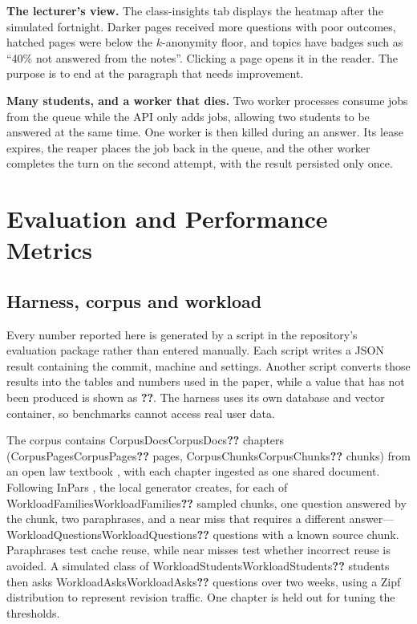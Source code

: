 \documentclass[conference]{IEEEtran}
\newcommand{\val}[1]{\ifcsname #1\endcsname\csname #1\endcsname\else\textbf{??}\fi}
\begin{document}
\textbf{The lecturer's view.} The class-insights tab displays the heatmap after the simulated fortnight. Darker pages received
more questions with poor outcomes, hatched pages were below the $k$-anonymity floor, and topics have
badges such as ``40\% not answered from the notes''. Clicking a page opens it in the reader. The
purpose is to end at the paragraph that needs improvement.

\textbf{Many students, and a worker that dies.} Two worker processes consume jobs from the queue while the API only adds jobs, allowing two students
to be answered at the same time. One worker is then killed during an answer. Its lease expires, the
reaper places the job back in the queue, and the other worker completes the turn on the second
attempt, with the result persisted only once.

\section{Evaluation and Performance Metrics}

\subsection{Harness, corpus and workload}

Every number reported here is generated by a script in the repository's evaluation package rather
than entered manually. Each script writes a JSON result containing the commit, machine and settings.
Another script converts those results into the tables and numbers used in the paper, while a value
that has not been produced is shown as \textbf{??}. The harness uses its own database and vector
container, so benchmarks cannot access real user data.

The corpus contains \val{CorpusDocs} chapters (\val{CorpusPages} pages, \val{CorpusChunks} chunks)
from an open law textbook \cite{valbrune2019bizlaw}, with each chapter ingested as one shared
document. Following InPars \cite{bonifacio2022inpars}, the local generator creates, for each of
\val{WorkloadFamilies} sampled chunks, one question answered by the chunk, two paraphrases, and a
near miss that requires a different answer---\val{WorkloadQuestions} questions with a known source
chunk. Paraphrases test cache reuse, while near misses test whether incorrect reuse is avoided. A
simulated class of \val{WorkloadStudents} students then asks \val{WorkloadAsks} questions over two
weeks, using a Zipf distribution to represent revision traffic. One chapter is held out for tuning
the thresholds.
\end{document}
